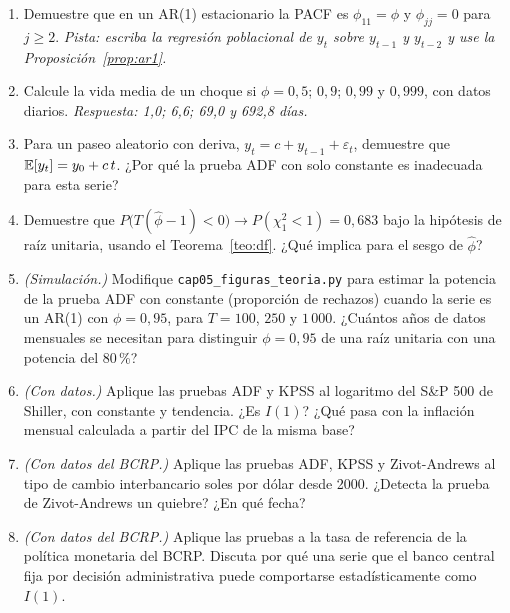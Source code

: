 \begin{enumerate}[label=\textbf{\thechapter.\arabic*},leftmargin=*,itemsep=6pt]
  \item Demuestre que en un AR(1) estacionario la PACF es $\phi_{11}=\phi$ y $\phi_{jj}=0$ para $j\ge2$.
  \textit{Pista: escriba la regresión poblacional de $y_t$ sobre $y_{t-1}$ y $y_{t-2}$ y use la
  Proposición~\ref{prop:ar1}.}

  \item Calcule la vida media de un choque si $\phi=0{,}5$; $0{,}9$; $0{,}99$ y $0{,}999$, con datos diarios.
  \textit{Respuesta: 1,0; 6,6; 69,0 y 692,8 días.}

  \item Para un paseo aleatorio con deriva, $y_t=c+y_{t-1}+\varepsilon_t$, demuestre que
  $\mathbb{E}[y_t]=y_0+c\,t$. ¿Por qué la prueba ADF con solo constante es inadecuada para esta serie?

  \item Demuestre que $P\bigl(T(\hat\phi-1)<0\bigr)\to P(\chi^2_1<1)=0{,}683$ bajo la hipótesis de raíz
  unitaria, usando el Teorema~\ref{teo:df}. ¿Qué implica para el sesgo de $\hat\phi$?

  \item \emph{(Simulación.)} Modifique \texttt{cap05\_figuras\_teoria.py} para estimar la potencia de la
  prueba ADF con constante (proporción de rechazos) cuando la serie es un AR(1) con $\phi=0{,}95$, para
  $T=100$, $250$ y $1\,000$. ¿Cuántos años de datos mensuales se necesitan para distinguir $\phi=0{,}95$ de
  una raíz unitaria con una potencia del 80\,\%?

  \item \emph{(Con datos.)} Aplique las pruebas ADF y KPSS al logaritmo del S\&P 500 de Shiller, con constante
  y tendencia. ¿Es $I(1)$? ¿Qué pasa con la inflación mensual calculada a partir del IPC de la misma base?

  \item \emph{(Con datos del BCRP.)} Aplique las pruebas ADF, KPSS y Zivot-Andrews al tipo de cambio
  interbancario soles por dólar desde 2000. ¿Detecta la prueba de Zivot-Andrews un quiebre? ¿En qué fecha?

  \item \emph{(Con datos del BCRP.)} Aplique las pruebas a la tasa de referencia de la política monetaria del
  BCRP. Discuta por qué una serie que el banco central fija por decisión administrativa puede comportarse
  estadísticamente como $I(1)$.
\end{enumerate}


